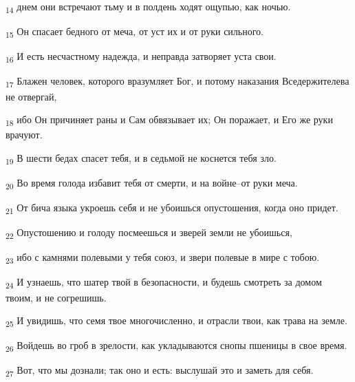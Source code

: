 \begin{tcolorbox}
\textsubscript{14} днем они встречают тьму и в полдень ходят ощупью, как ночью.
\end{tcolorbox}
\begin{tcolorbox}
\textsubscript{15} Он спасает бедного от меча, от уст их и от руки сильного.
\end{tcolorbox}
\begin{tcolorbox}
\textsubscript{16} И есть несчастному надежда, и неправда затворяет уста свои.
\end{tcolorbox}
\begin{tcolorbox}
\textsubscript{17} Блажен человек, которого вразумляет Бог, и потому наказания Вседержителева не отвергай,
\end{tcolorbox}
\begin{tcolorbox}
\textsubscript{18} ибо Он причиняет раны и Сам обвязывает их; Он поражает, и Его же руки врачуют.
\end{tcolorbox}
\begin{tcolorbox}
\textsubscript{19} В шести бедах спасет тебя, и в седьмой не коснется тебя зло.
\end{tcolorbox}
\begin{tcolorbox}
\textsubscript{20} Во время голода избавит тебя от смерти, и на войне--от руки меча.
\end{tcolorbox}
\begin{tcolorbox}
\textsubscript{21} От бича языка укроешь себя и не убоишься опустошения, когда оно придет.
\end{tcolorbox}
\begin{tcolorbox}
\textsubscript{22} Опустошению и голоду посмеешься и зверей земли не убоишься,
\end{tcolorbox}
\begin{tcolorbox}
\textsubscript{23} ибо с камнями полевыми у тебя союз, и звери полевые в мире с тобою.
\end{tcolorbox}
\begin{tcolorbox}
\textsubscript{24} И узнаешь, что шатер твой в безопасности, и будешь смотреть за домом твоим, и не согрешишь.
\end{tcolorbox}
\begin{tcolorbox}
\textsubscript{25} И увидишь, что семя твое многочисленно, и отрасли твои, как трава на земле.
\end{tcolorbox}
\begin{tcolorbox}
\textsubscript{26} Войдешь во гроб в зрелости, как укладываются снопы пшеницы в свое время.
\end{tcolorbox}
\begin{tcolorbox}
\textsubscript{27} Вот, что мы дознали; так оно и есть: выслушай это и заметь для себя.
\end{tcolorbox}
